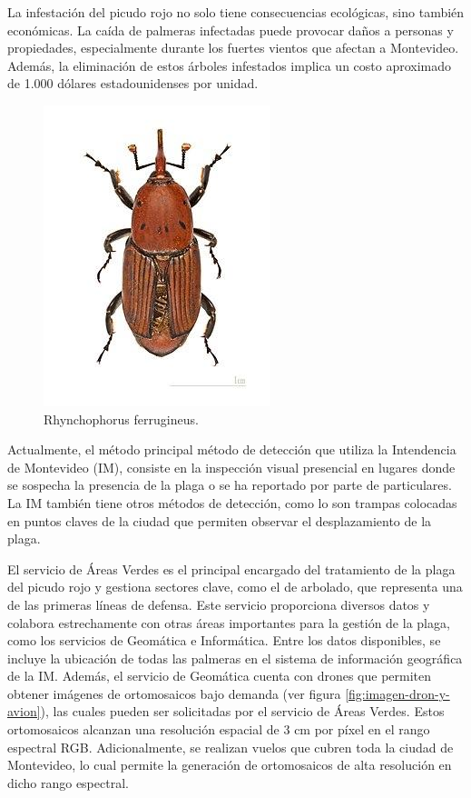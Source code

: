 \documentclass[
11pt, %
]{charter}
\begin{document}
La infestación del picudo rojo no solo tiene consecuencias ecológicas, sino también económicas. La caída de palmeras infectadas puede provocar daños a personas y propiedades, especialmente durante los fuertes vientos que afectan a Montevideo. Además, la eliminación de estos árboles infestados implica un costo aproximado de 1.000 dólares estadounidenses por unidad.

\begin{figure}[H]
  \centering
  \includegraphics[width=.30\textwidth]{./Figuras/picudo-rojo.png}
  \caption{Rhynchophorus ferrugineus.}
  \label{fig:picudo-rojo}
\end{figure}

Actualmente, el método principal método de detección que utiliza la Intendencia de Montevideo (IM), consiste en la inspección visual presencial en lugares donde se sospecha la presencia de la plaga o se ha reportado por parte de particulares. La IM también tiene otros métodos de detección, como lo son trampas colocadas en puntos claves de la ciudad que permiten observar el desplazamiento de la plaga.

El servicio de Áreas Verdes es el principal encargado del tratamiento de la plaga del picudo rojo y gestiona sectores clave, como el de arbolado, que representa una de las primeras líneas de defensa. Este servicio proporciona diversos datos y colabora estrechamente con otras áreas importantes para la gestión de la plaga, como los servicios de Geomática e Informática. Entre los datos disponibles, se incluye la ubicación de todas las palmeras en el sistema de información geográfica de la IM. Además, el servicio de Geomática cuenta con drones que permiten obtener imágenes de ortomosaicos bajo demanda (ver figura \ref{fig:imagen-dron-y-avion}), las cuales pueden ser solicitadas por el servicio de Áreas Verdes. Estos ortomosaicos alcanzan una resolución espacial de 3 cm por píxel en el rango espectral RGB. Adicionalmente, se realizan vuelos que cubren toda la ciudad de Montevideo, lo cual permite la generación de ortomosaicos de alta resolución en dicho rango espectral.
\end{document}

